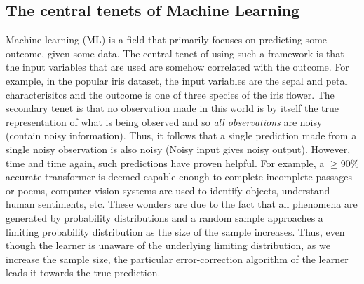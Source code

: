 \documentclass[12pt, letterpaper]{article}
\begin{document}
\subsection{The central tenets of Machine Learning}
\label{sec: The central tenets of Machine Learning}
Machine learning (ML) is a field that primarily focuses on predicting some outcome, given some data. The central
tenet of using such a framework is that the input variables that are used are somehow correlated 
with the outcome. For example, in the popular iris dataset, the input variables are the sepal and petal
characterisitcs and the outcome is one of three species of the iris flower. The secondary tenet is 
that no observation made in this world is by itself the true representation of what is being observed and 
so \textit{all observations} are noisy (contain noisy information). Thus, it follows that a single 
prediction made from a single noisy observation is also noisy (Noisy input gives noisy output). However,
time and time again, such predictions have proven helpful. For example, a $\geq90\%$ accurate transformer
is deemed capable enough to complete incomplete passages or poems, computer vision systems are used to 
identify objects, understand human sentiments, etc. These wonders are due to the fact that all phenomena
are generated by probability distributions and a random sample approaches a limiting probability
distribution as the size of the sample increases. Thus, even though the learner is unaware of the underlying 
limiting distribution, as we increase the sample size, the particular error-correction algorithm of the learner
leads it towards the true prediction. 
\end{document}
